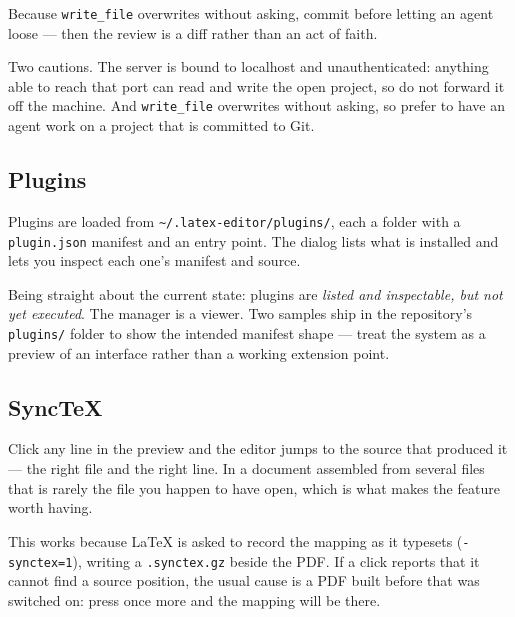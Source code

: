 Because \texttt{write\_file} overwrites without asking, commit before letting an
agent loose --- then the review is a diff rather than an act of faith.

Two cautions. The server is bound to localhost and unauthenticated: anything
able to reach that port can read and write the open project, so do not forward
it off the machine. And \texttt{write\_file} overwrites without asking, so
prefer to have an agent work on a project that is committed to Git.

\subsection{Plugins}

Plugins are loaded from \texttt{\textasciitilde/.latex-editor/plugins/}, each a
folder with a \texttt{plugin.json} manifest and an entry point. The
 dialog lists what is installed and lets you inspect each one's
manifest and source.

Being straight about the current state: plugins are \emph{listed and
inspectable, but not yet executed}. The manager is a viewer. Two samples ship
in the repository's \texttt{plugins/} folder to show the intended manifest
shape --- treat the system as a preview of an interface rather than a working
extension point.

\subsection{SyncTeX}

Click any line in the preview and the editor jumps to the source that produced
it --- the right file and the right line. In a document assembled from several
\verb|| files that is rarely the file you happen to have open, which is
what makes the feature worth having.

This works because \LaTeX{} is asked to record the mapping as it typesets
(\texttt{-synctex=1}), writing a \texttt{.synctex.gz} beside the PDF. If a
click reports that it cannot find a source position, the usual cause is a PDF
built before that was switched on: press  once more and the
mapping will be there.
